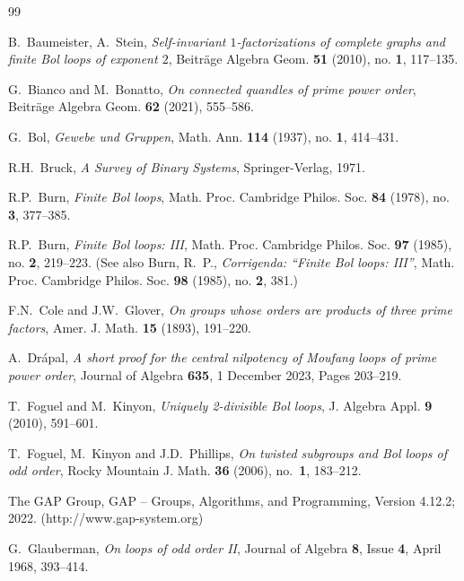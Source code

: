 \documentclass[12pt,reqno]{amsart}
\numberwithin{equation}{section}
\theoremstyle{plain}
\theoremstyle{definition}
\begin{document}
\begin{thebibliography}{99} %

B.~Baumeister, A.~Stein, \emph{Self-invariant $1$-factorizations of complete graphs and finite Bol loops of exponent $2$}, Beitr\"age Algebra Geom. \textbf{51} (2010), no. \textbf{1}, 117--135.

G.~Bianco and M.~Bonatto, \emph{On connected quandles of prime power order}, Beitr\"age Algebra Geom. \textbf{62} (2021), 555--586.

G.~Bol, \emph{Gewebe und Gruppen}, Math. Ann. \textbf{114} (1937), no. \textbf{1}, 414--431.

R.H.~Bruck, \emph{A Survey of Binary Systems}, Springer-Verlag, 1971.

R.P.~Burn, \emph{Finite Bol loops}, Math. Proc. Cambridge Philos. Soc. \textbf{84} (1978), no. \textbf{3}, 377--385.


R.P.~Burn, \emph{Finite Bol loops: III}, Math. Proc. Cambridge Philos. Soc. \textbf{97} (1985), no. \textbf{2}, 219--223. (See also Burn, R.~P., \emph{Corrigenda: ``Finite Bol loops: III''}, Math. Proc. Cambridge Philos. Soc. \textbf{98} (1985), no. \textbf{2}, 381.)

F.N.~Cole and J.W.~Glover, \emph{On groups whose orders are products of three prime factors}, Amer. J. Math. \textbf{15} (1893), 191--220.

A.~Dr\'apal, \emph{A short proof for the central nilpotency of Moufang loops of prime power order}, Journal of Algebra \textbf{635}, 1 December 2023, Pages 203--219.

T.~Foguel and M.~Kinyon, \emph{Uniquely 2-divisible Bol loops}, J. Algebra Appl. \textbf{9} (2010), 591--601.

T.~Foguel, M.~Kinyon and J.D.~Phillips, \emph{On twisted subgroups and Bol loops of odd order}, Rocky Mountain J. Math. \textbf{36} (2006), no.~\textbf{1}, 183--212.

 The GAP Group, GAP -- Groups, Algorithms, and Programming, Version 4.12.2; 2022. (http://www.gap-system.org)

G.~Glauberman, \emph{On loops of odd order II}, Journal of Algebra \textbf{8}, Issue \textbf{4}, April 1968, 393--414.


\end{thebibliography}
\end{document}
